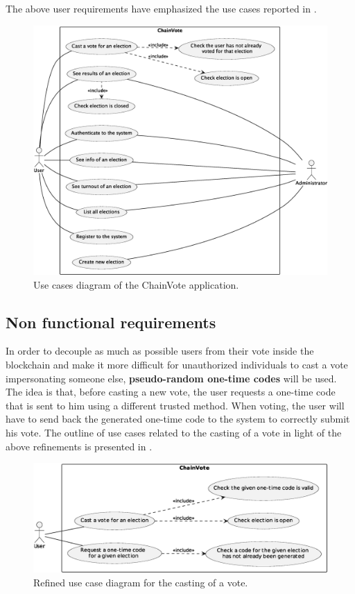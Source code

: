 \documentclass{scrartcl}
\begin{document}
The above user requirements have emphasized the use cases reported in .

\begin{figure}
    \centering
    \includegraphics[width=\linewidth]{figures/use-cases.eps}
    \caption{Use cases diagram of the ChainVote application.}
    \label{fig:use-cases-diagram} 
\end{figure}

\subsection{Non functional requirements}
\label{sec:non-functional-requirements}

In order to decouple as much as possible users from their vote inside the blockchain and make it more difficult for unauthorized individuals to cast a vote impersonating someone else, \textbf{pseudo-random one-time codes} will be used.
%
The idea is that, before casting a new vote, the user requests a one-time code that is sent to him using a different trusted method.
%
When voting, the user will have to send back the generated one-time code to the system to correctly submit his vote.
%
The outline of use cases related to the casting of a vote in light of the above refinements is presented in .

\begin{figure}
    \centering
    \includegraphics[width=\linewidth]{figures/refined-cast-vote-use-case.eps}
    \caption{Refined use case diagram for the casting of a vote.}
    \label{fig:refined-cast-vote-use-case}
\end{figure}
\end{document}
